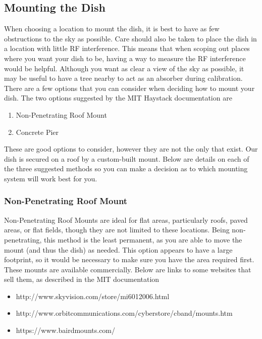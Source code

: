 \documentclass[11pt]{article} %
\begin{document}
\subsection{Mounting the Dish}

When choosing a location to mount the dish, it is best to have as few obstructions to the sky as possible. Care should also be taken to place the dish in a location with little RF interference. This means that when scoping out places where you want your dish to be, having a way to measure the RF interference would be helpful. Although you want as clear a view of the sky as possible, it may be useful to have a tree nearby to act as an absorber during calibration. \\
There are a few options that you can consider when deciding how to mount your dish. The two options suggested by the MIT Haystack documentation are

\begin{enumerate}
\item Non-Penetrating Roof Mount
\item Concrete Pier
\end{enumerate}

These are good options to consider, however they are not the only that exist. Our dish is secured on a roof by a custom-built mount. Below are details on each of the three suggested methods so you can make a decision as to which mounting system will work best for you.

\subsubsection{Non-Penetrating Roof Mount}

Non-Penetrating Roof Mounts are ideal for flat areas, particularly roofs, paved areas, or flat fields, though they are not limited to these locations. Being non-penetrating, this method is the least permanent, as you are able to move the mount (and thus the dish) as needed. This option appears to have a large footprint, so it would be necessary to make sure you have the area required first. These mounts are available commercially. Below are links to some websites that sell them, as described in the MIT documentation

\begin{itemize}
\item http://www.skyvision.com/store/mi6012006.html
\item http://www.orbitcommunications.com/cyberstore/cband/mounts.htm
\item https://www.bairdmounts.com/
\end{itemize}
\end{document}
